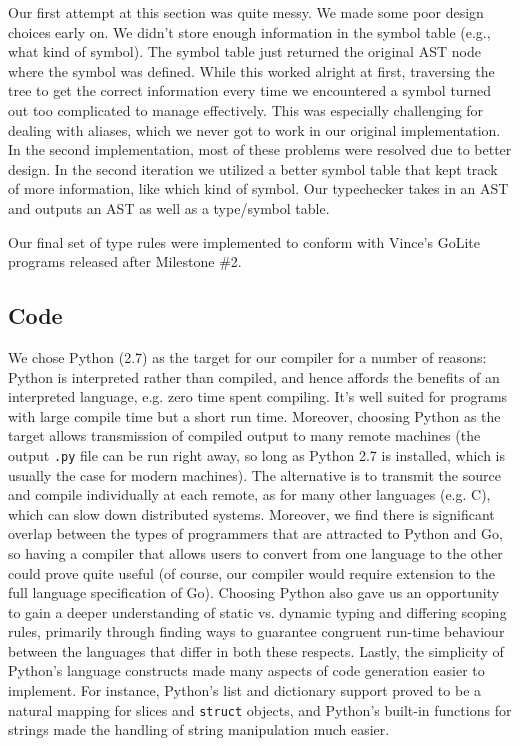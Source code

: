 \documentclass{article}
\begin{document}
Our first attempt at this section was quite messy. We made some poor design choices early on. We didn't store enough information in the symbol table (e.g., what kind of symbol). The symbol table just returned the original AST node where the symbol was defined. While this worked alright at first, traversing the tree to get the correct information every time we encountered a symbol turned out too complicated to manage effectively. This was especially challenging for dealing with aliases, which we never got to work in our original implementation. In the second implementation, most of these problems were resolved due to better design. In the second iteration we utilized a better symbol table that kept track of more information, like which kind of symbol. Our typechecker takes in an AST and outputs an AST as well as a type/symbol table.

Our final set of type rules were implemented to conform with Vince's GoLite programs released after Milestone \#2.

\subsection{Code}

We chose Python (2.7) as the target for our compiler for a number of reasons: Python is interpreted rather than compiled, and hence affords the benefits of an interpreted language, e.g. zero time spent compiling. It's well suited for programs with large compile time but a short run time. Moreover, choosing Python as the target allows transmission of compiled output to many remote machines (the output \texttt{.py} file can be run right away, so long as Python 2.7 is installed, which is usually the case for modern machines). The alternative is to transmit the source and compile individually at each remote, as  for many other languages (e.g. C), which can slow down distributed systems. Moreover, we find there is significant overlap between the types of programmers that are attracted to Python and Go, so having a compiler that allows users to convert from one language to the other could prove quite useful (of course, our compiler would require extension to the full language specification of Go). Choosing Python also gave us an opportunity to gain a deeper understanding of static vs. dynamic typing and differing scoping rules, primarily through finding ways to guarantee congruent run-time behaviour between the languages that differ in both these respects. Lastly, the simplicity of Python's language constructs made many aspects of code generation easier to implement. For instance, Python's list and dictionary support proved to be a natural mapping for slices and \texttt{struct} objects, and Python's built-in functions for strings made the handling of string manipulation much easier.
\end{document}
